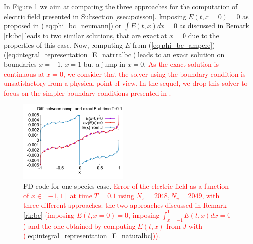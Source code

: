 \documentclass{article}
\numberwithin{equation}{section}
\newcommand{\imh}{\textheight} %
\begin{document}
In Figure \ref{fig:DF_fe_and_bc} 
we aim at comparing the three approaches for the computation of electric field presented in Subsection \ref{ssec:poisson}. Imposing $E(t,x=0)=0$ as proposed in (\ref{eq:phi_bc_neumann}) or $\int E(t,x)dx=0$ as discussed in Remark \ref{rk:bc} leads to two similar solutions, that are exact at $x=0$ due to the properties of this  case. Now, computing $E$ from (\ref{eq:phi_bc_ampere})-(\ref{eq:integral_representation_E_naturalbc}) leads to an exact solution on boundaries $x=-1$, $x=1$ but a jump in $x=0$. \textcolor{red}{As the exact solution is continuous at $x=0$, we consider that the solver  using the boundary condition  is unsatisfactory from a physical point of view. In the sequel, we drop this solver to focus on the simpler boundary conditions presented in .}

\begin{figure}
	\centering
	\renewcommand{\imh}{0.33\linewidth}
	\includegraphics[width=0.48\textwidth]{images/diff_E_3bc_acstcase.png}
	\caption{FD code for one species case. \textcolor{red}{Error of the electric field as a function of $x\in [-1,1]$ at time $T=0.1$ using  $N_x=2048, N_v=2049$, with  three different approaches: the two approaches discussed in Remark \ref{rk:bc} (imposing $E(t,x=0)=0$, imposing $\int_{x=-1}^1 E(t,x)dx=0$)  and the one obtained by computing $E(t,x)$ from $J$ with (\ref{eq:integral_representation_E_naturalbc})).} \\   %
	}
	\label{fig:DF_fe_and_bc}
\end{figure}
\end{document}

